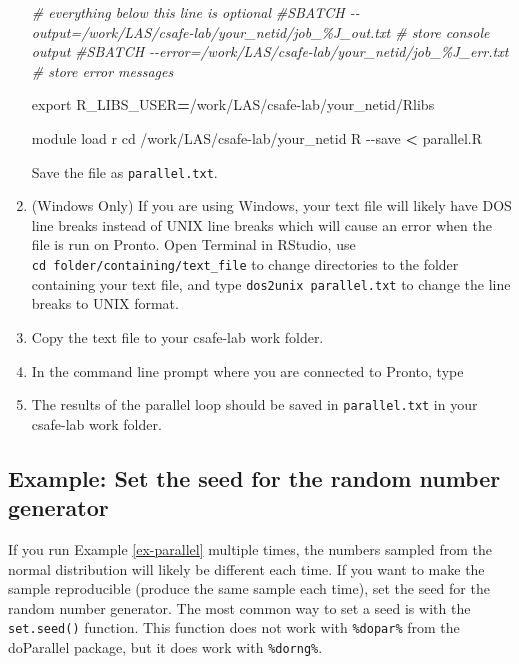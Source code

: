 \documentclass[
]{book}
\newenvironment{Shaded}{\begin{snugshade}}{\end{snugshade}}
\newcommand{\AttributeTok}[1]{\textcolor[rgb]{0.77,0.63,0.00}{#1}}
\newcommand{\BuiltInTok}[1]{#1}
\newcommand{\CommentTok}[1]{\textcolor[rgb]{0.56,0.35,0.01}{\textit{#1}}}
\newcommand{\ExtensionTok}[1]{#1}
\newcommand{\NormalTok}[1]{#1}
\newcommand{\OperatorTok}[1]{\textcolor[rgb]{0.81,0.36,0.00}{\textbf{#1}}}
\newcommand{\VariableTok}[1]{\textcolor[rgb]{0.00,0.00,0.00}{#1}}
\begin{document}
\begin{enumerate}
\begin{Shaded}
\begin{Highlighting}[]
\CommentTok{\# everything below this line is optional}
\CommentTok{\#SBATCH {-}{-}output=/work/LAS/csafe{-}lab/your\_netid/job\_\%J\_out.txt \# store console output}
\CommentTok{\#SBATCH {-}{-}error=/work/LAS/csafe{-}lab/your\_netid/job\_\%J\_err.txt \# store error messages}

\BuiltInTok{export} \VariableTok{R\_LIBS\_USER}\OperatorTok{=}\NormalTok{/work/LAS/csafe{-}lab/your\_netid/Rlibs}

\ExtensionTok{module}\NormalTok{ load r}
\BuiltInTok{cd}\NormalTok{ /work/LAS/csafe{-}lab/your\_netid}
\ExtensionTok{R} \AttributeTok{{-}{-}save} \OperatorTok{\textless{}}\NormalTok{ parallel.R}
\end{Highlighting}
\end{Shaded}

  Save the file as \texttt{parallel.txt}.
\item
  (Windows Only) If you are using Windows, your text file will likely have DOS line breaks instead of UNIX line breaks which will cause an error when the file is run on Pronto. Open Terminal in RStudio, use \texttt{cd\ folder/containing/text\_file} to change directories to the folder containing your text file, and type \texttt{dos2unix\ parallel.txt} to change the line breaks to UNIX format.
\item
  Copy the text file to your csafe-lab work folder.
\item
  In the command line prompt where you are connected to Pronto, type

\begin{Shaded}
\end{Shaded}
\item
  The results of the parallel loop should be saved in \texttt{parallel.txt} in your csafe-lab work folder.
\end{enumerate}

\hypertarget{ex-seed}{%
\subsection{Example: Set the seed for the random number generator}\label{ex-seed}}

If you run Example \ref{ex-parallel} multiple times, the numbers sampled from the normal distribution will likely be different each time. If you want to make the sample reproducible
(produce the same sample each time), set the seed for the random number generator. The most common way to set a seed is with the \texttt{set.seed()} function. This function does not work with \texttt{\%dopar\%} from the doParallel package, but it does work with \texttt{\%dorng\%}.
\end{document}
